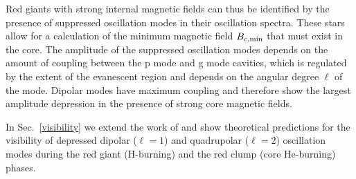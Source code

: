 Red giants with strong internal magnetic fields can thus be identified by the presence of suppressed oscillation modes in their oscillation spectra. These stars allow for a calculation of the minimum magnetic field $B_{c,{\rm min}}$ that must exist in the core. The amplitude of the suppressed oscillation modes depends on the amount of coupling between the p mode and g mode cavities, which is regulated by the extent of the evanescent region and depends on the angular degree $\ell$ of the mode. Dipolar modes have maximum coupling and therefore show the largest amplitude depression in the presence of strong core magnetic fields. 

In Sec.~\ref{visibility} we extend the work of \citet{Fuller_2015} and show theoretical predictions for the visibility of depressed dipolar ($\ell=1$) and quadrupolar ($\ell=2$) oscillation modes during the red giant  (H-burning) and  the red clump (core He-burning) phases. 




  